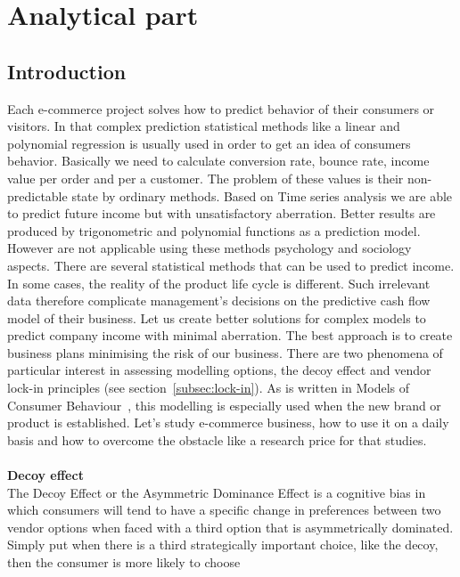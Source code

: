 
\chapter{Analytical part} \label{sec:analytical}

\section{Introduction} \label{sec:introduction}
Each e-commerce project solves how to predict behavior of their consumers or visitors.
In that complex prediction statistical methods like a linear and polynomial regression is usually used in order to
get an idea of consumers behavior.
Basically we need to calculate conversion rate, bounce rate, income value per order and per a customer.
The problem of these values is their non-predictable state by ordinary methods.
Based on Time series analysis we are able to predict
future income but with unsatisfactory aberration.
Better results are produced by trigonometric and polynomial functions as a prediction model.
However are not applicable using these methods psychology and sociology aspects.
There are several statistical methods that can be used to predict income.
In some cases, the reality of the product life cycle is different.
Such irrelevant data therefore complicate management's decisions on the predictive cash flow model of their business.
Let us create better solutions for complex models to predict company income with minimal aberration.
The best approach is to create business plans minimising the risk of our business.
There are  two phenomena of particular interest in assessing modelling options,  the decoy effect and vendor lock-in principles (see section~\ref{subsec:lock-in}).
As is written in Models of Consumer Behaviour~\cite{patel}, this modelling is especially used when the new brand or product is established.
Let's study e-commerce business, how to use it on a daily basis and how to overcome the obstacle like a research price for that studies.\\
\\
\textbf{Decoy effect} \label{subsec:decoy}\\
The Decoy Effect or the Asymmetric Dominance Effect is a cognitive bias in which consumers will tend to have a specific
change in preferences between two vendor options when faced with a third option that is asymmetrically dominated.
Simply put when there is a third strategically important choice, like the decoy, then the consumer is more likely to choose
